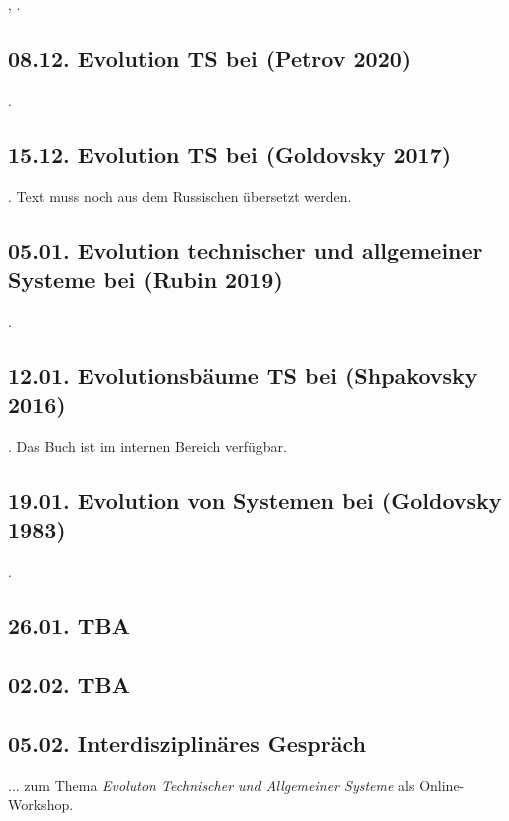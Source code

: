 \documentclass[11pt,a4paper]{article}
\begin{document}
\cite{Altschuller1979}, \cite{Petrov2020a}.

\subsection*{08.12. Evolution TS bei (Petrov 2020)} 

\cite{Petrov2020b}.

\subsection*{15.12. Evolution TS bei (Goldovsky 2017)} 

\cite{Goldovsky2017}. Text muss noch aus dem Russischen übersetzt werden. 

\subsection*{05.01. Evolution technischer und allgemeiner Systeme bei (Rubin
  2019)}  

\cite{Rubin2019}.

\subsection*{12.01. Evolutionsbäume TS bei (Shpakovsky 2016)}

\cite{Shpakovsky2016}.  Das Buch ist im internen Bereich verfügbar. 

\subsection*{19.01. Evolution von Systemen bei (Goldovsky 1983)}

\cite{Goldovsky1983}.

\subsection*{26.01. TBA}

\subsection*{02.02. TBA}

\subsection*{05.02. Interdisziplinäres Gespräch}

... zum Thema \emph{Evoluton Technischer und Allgemeiner Systeme} als
Online-Workshop.
\end{document}
